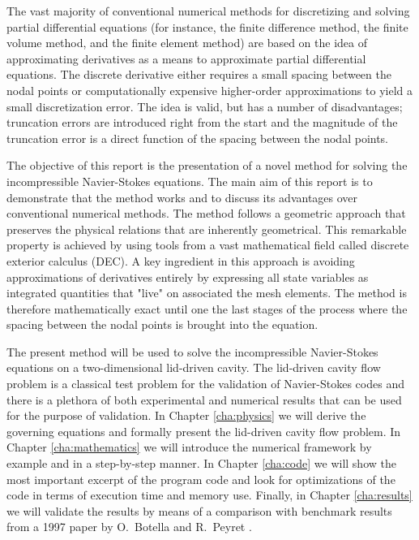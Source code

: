 The vast majority of conventional numerical methods for discretizing and solving partial differential equations (for instance, the finite difference method, the finite volume method, and the finite element method) are based on the idea of approximating derivatives as a means to approximate partial differential equations. The discrete derivative either requires a small spacing between the nodal points or computationally expensive higher-order approximations to yield a small discretization error. The idea is valid, but has a number of disadvantages; truncation errors are introduced right from the start and the magnitude of the truncation error is a direct function of the spacing between the nodal points.

The objective of this report is the presentation of a novel method for solving the incompressible Navier-Stokes equations. The main aim of this report is to demonstrate that the method works and to discuss its advantages over conventional numerical methods. The method follows a geometric approach that preserves the physical relations that are inherently geometrical. This remarkable property is achieved by using tools from a vast mathematical field called discrete exterior calculus (DEC). A key ingredient in this approach is avoiding approximations of derivatives entirely by expressing all state variables as integrated quantities that "live" on associated the mesh elements. The method is therefore mathematically exact until one the last stages of the process where the spacing between the nodal points is brought into the equation.

The present method will be used to solve the incompressible Navier-Stokes equations on a two-dimensional lid-driven cavity. The lid-driven cavity flow problem is a classical test problem for the validation of Navier-Stokes codes and there is a plethora of both experimental and numerical results that can be used for the purpose of validation. In Chapter \ref{cha:physics} we will derive the governing equations and formally present the lid-driven cavity flow problem. In Chapter \ref{cha:mathematics} we will introduce the numerical framework by example and in a step-by-step manner. In Chapter \ref{cha:code} we will show the most important excerpt of the program code and look for optimizations of the code in terms of execution time and memory use. Finally, in Chapter \ref{cha:results} we will validate the results by means of a comparison with benchmark results from a 1997 paper by O.~Botella and R.~Peyret \parencite{botella1998benchmark}.

